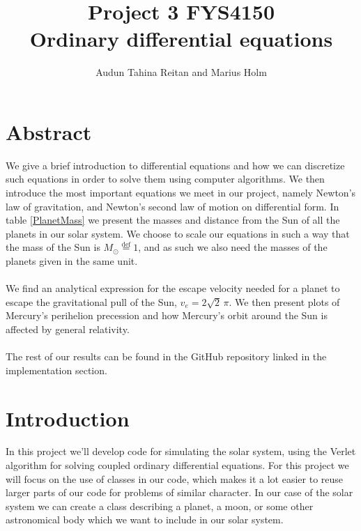 \documentclass[a4paper, fontsize=11pt]{article}
\begin{document}
\title{Project 3 FYS4150 \\ Ordinary differential equations}
\author{Audun Tahina Reitan and Marius Holm}

\maketitle


\section{Abstract}
We give a brief introduction to differential equations and how we can discretize such equations in order to solve them using computer algorithms. We then introduce the most important equations we meet in our project, namely Newton's law of gravitation, and Newton's second law of motion on differential form. In table \ref{PlanetMass} we present the masses and distance from the Sun of all the planets in our solar system. We choose to scale our equations in such a way that the mass of the Sun is $M_{\odot}\overset{\text{def}}{=} 1$, and as such we also need the masses of the planets given in the same unit.


\paragraph{}
We find an analytical expression for the escape velocity needed for a planet to escape the gravitational pull of the Sun, $v_{e} = 2\sqrt{2} \, \pi$. We then present plots of Mercury's perihelion precession and how Mercury's orbit around the Sun is affected by general relativity.


\paragraph{}
The rest of our results can be found in the GitHub repository linked in the implementation section. 

\section{Introduction}
In this project we'll develop code for simulating the solar system, using the Verlet algorithm for solving coupled ordinary differential equations. For this project we will focus on the use of classes in our code, which makes it a lot easier to reuse larger parts of our code for problems of similar character. In our case of the solar system we can create a class describing a planet, a moon, or some other astronomical body which we want to include in our solar system.
\end{document}
